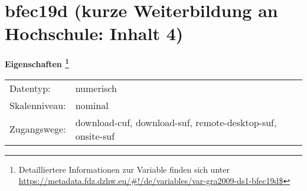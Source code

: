 
    \setcounter{footnote}{0}

    \vspace*{-1.8cm}
	\section{bfec19d (kurze Weiterbildung an Hochschule: Inhalt 4)}
	\label{section:bfec19d}



    \vspace*{0.5cm}
    \noindent\textbf{Eigenschaften
	\footnote{Detailliertere Informationen zur Variable finden sich unter
		\url{https://metadata.fdz.dzhw.eu/\#!/de/variables/var-gra2009-ds1-bfec19d$}}}\\
	\begin{tabularx}{\hsize}{@{}lX}
	Datentyp: & numerisch \\
	Skalenniveau: & nominal \\
	Zugangswege: &
	  download-cuf, 
	  download-suf, 
	  remote-desktop-suf, 
	  onsite-suf
 \\
    \end{tabularx}




